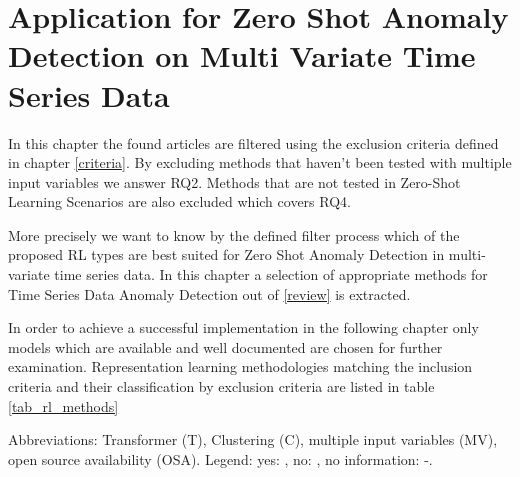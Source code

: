 \section{Application for Zero Shot Anomaly Detection on Multi Variate Time Series Data}\label{application}
In this chapter the found articles are filtered using the exclusion criteria defined in chapter \ref{criteria}. By excluding methods that haven't been tested with multiple input variables we answer RQ2. Methods that are not tested in Zero-Shot Learning Scenarios are also excluded which covers RQ4.

More precisely we want to know by the defined filter process which of the proposed RL types are best suited for Zero Shot Anomaly Detection in multi-variate time series data. In this chapter a selection of appropriate methods for Time Series Data Anomaly Detection out of \ref{review} is extracted.

 In order to achieve a successful implementation in the following chapter only models which are available and well documented are chosen for further examination. Representation learning methodologies matching the inclusion criteria and their classification by exclusion criteria are listed in table \ref{tab_rl_methods}
 \begin{table}
   \caption{Abbreviations: Transformer (T), Clustering (C), multiple input variables (MV), open source availability (OSA). Legend: yes: \cmark, no: \xmark, no information: -.}\label{tab_rl_methods}
   
 \end{table}
